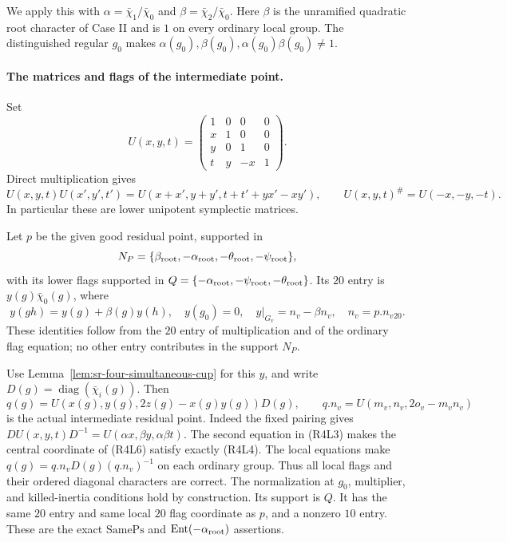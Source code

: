 We apply this with
\(\alpha=\bar\chi_1/\bar\chi_0\) and
\(\beta=\bar\chi_2/\bar\chi_0\).
Here \(\beta\) is the unramified quadratic root character of
Case II and is \(1\) on every ordinary local group.
The distinguished regular \(g_0\) makes
\(\alpha(g_0),\beta(g_0),\alpha(g_0)\beta(g_0)\ne1\).

\paragraph{The matrices and flags of the intermediate point.}
Set
\[
 U(x,y,t)=
 \begin{pmatrix}
 1&0&0&0\\x&1&0&0\\y&0&1&0\\t&y&-x&1
 \end{pmatrix}.
\]
Direct multiplication gives
\[
 U(x,y,t)U(x',y',t')
       =U(x+x',y+y',t+t'+yx'-xy'),\qquad
                         U(x,y,t)^\#=U(-x,-y,-t).         \tag{R4L4}
\]
In particular these are lower unipotent symplectic matrices.

Let \(p\) be the given good residual point, supported in
\[
 N_P=\{\beta_{\rm root},-\alpha_{\rm root},
                       -\theta_{\rm root},-\psi_{\rm root}\},
\]
with its lower flags supported in
\(Q=\{-\alpha_{\rm root},-\psi_{\rm root},-\theta_{\rm root}\}\).
Its \(20\) entry is \(y(g)\bar\chi_0(g)\), where
\[
 y(gh)=y(g)+\beta(g)y(h),\quad y(g_0)=0,\quad
 y|_{G_v}=n_v-\beta n_v,\quad n_v=p.n_v{}_{20}.             \tag{R4L5}
\]
These identities follow from the \(20\) entry of multiplication
and of the ordinary flag equation; no other entry contributes
in the support \(N_P\).

Use Lemma~\ref{lem:sr-four-simultaneous-cup} for this \(y\),
and write \(D(g)=\operatorname{diag}(\bar\chi_i(g))\).
Then
\[
 q(g)=U(x(g),y(g),2z(g)-x(g)y(g))D(g),\qquad
 q.n_v=U(m_v,n_v,2o_v-m_vn_v)                              \tag{R4L6}
\]
is the actual intermediate residual point.
Indeed the fixed pairing gives
\(D U(x,y,t)D^{-1}=U(\alpha x,\beta y,\alpha\beta t)\).
The second equation in (R4L3) makes the central coordinate
of (R4L6) satisfy exactly (R4L4).
The local equations make
\(q(g)=q.n_vD(g)(q.n_v)^{-1}\) on each ordinary group.
Thus all local flags and their ordered diagonal characters
are correct.
The normalization at \(g_0\), multiplier, and killed-inertia
conditions hold by construction.
Its support is \(Q\).
It has the same \(20\) entry and same local \(20\) flag
coordinate as \(p\), and a nonzero \(10\) entry.
These are the exact \(\mathrm{SamePs}\) and
\(\mathrm{Ent}(-\alpha_{\rm root})\) assertions.

